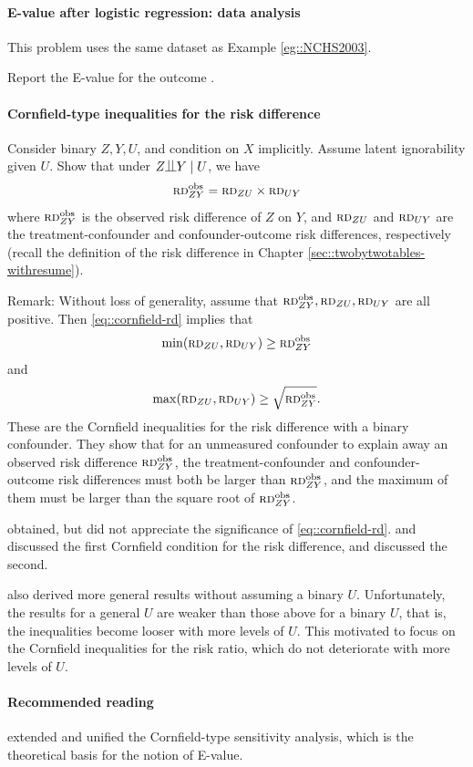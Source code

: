  
\paragraph{E-value after logistic regression: data analysis}\label{hw::eg::NCHS2003}

This problem uses the same dataset as Example \ref{eg::NCHS2003}. 

Report the E-value for the outcome . 


\paragraph{Cornfield-type inequalities for the risk difference}\label{hw::cornfield-rd}



Consider binary $Z, Y, U$, and condition on $X$ implicitly. Assume latent ignorability given $U$.  Show that under $Z\ind Y\mid U$, we have
\begin{eqnarray}
\RD_{ZY}^\obs = \RD_{ZU} \times \RD_{UY}
\label{eq::cornfield-rd}
\end{eqnarray}
where $\textsc{rd}_{ZY}^{\textup{obs}}$ is the observed risk difference of $Z$ on $Y$, and $\textsc{rd}_{ZU}$ and $ \textsc{rd}_{UY}$ are the treatment-confounder and confounder-outcome risk differences, respectively (recall the definition of the risk difference in Chapter \ref{sec::twobytwotables-withresume}). 


Remark: Without loss of generality, assume that $\textsc{rd}_{ZY}^{\textup{obs}}, \textsc{rd}_{ZU} ,\textsc{rd}_{UY}$ are all positive. Then \eqref{eq::cornfield-rd} implies that 
$$
\min(\textsc{rd}_{ZU}  , \textsc{rd}_{UY}) \geq \textsc{rd}_{ZY}^{\textup{obs}}
$$
and
$$
\max(\textsc{rd}_{ZU}  , \textsc{rd}_{UY}) \geq  \sqrt{ \textsc{rd}_{ZY}^{\textup{obs}}} .
$$
These are the Cornfield inequalities for the risk difference with a binary confounder.
They show that for an unmeasured confounder to explain away an observed risk difference $\textsc{rd}_{ZY}^{\textup{obs}}$, the treatment-confounder and confounder-outcome risk differences must both be larger than $\textsc{rd}_{ZY}^{\textup{obs}}$, and the maximum of them must be larger than the square root of $\textsc{rd}_{ZY}^{\textup{obs}}$.

\citet{Cornfield::1959} obtained, but did not appreciate the significance of \eqref{eq::cornfield-rd}. \citet{gastwirth1998cornfield} and \citet{poole2010origin} discussed the first Cornfield condition for the risk difference, and \citet{ding2014generalized} discussed the second. 

\citet{ding2014generalized}  also derived more general results without assuming a binary $U$. Unfortunately, the results for a general $U$ are weaker than those above for a binary $U$, that is, the inequalities become looser with more levels of $U$. This motivated \citet{ding2016sensitivity} to focus on the Cornfield inequalities for the risk ratio, which do not deteriorate with more levels of $U$.




\paragraph{Recommended reading}


\citet{ding2016sensitivity}  extended and unified the Cornfield-type sensitivity analysis, which is the theoretical basis for the notion of E-value.   

